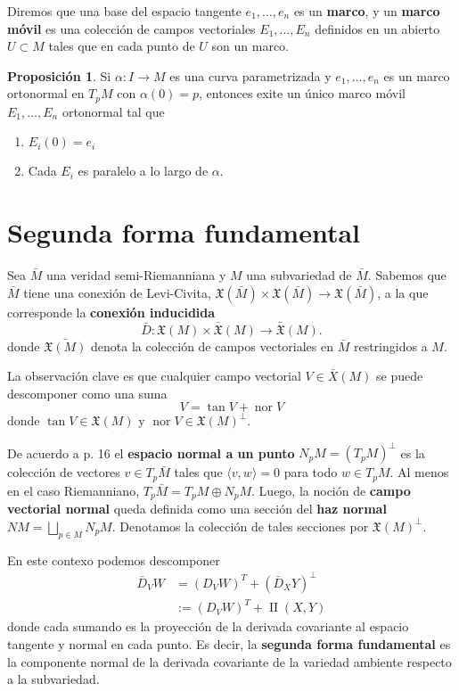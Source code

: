 \documentclass[spanish]{book}
\theoremstyle{definition}
\newtheorem*{prop}{Proposición}
\newcommand{\X}{\mathfrak{X}}
\begin{document}
Diremos que una base del espacio tangente $e_1,\ldots,e_n$ es un \textbf{marco}, y un \textbf{marco móvil} es una colección de campos vectoriales $E_1,\ldots,E_n$ definidos en un abierto $U\subset M$ tales que en cada punto de $U$ son un marco.
\begin{prop}
	Si $\alpha:I\to M$ es una curva parametrizada y $e_1,\ldots,e_n$ es un marco ortonormal en $T_pM$ con $\alpha(0)=p$, entonces exite un único marco móvil $E_1,\ldots,E_n$ ortonormal tal que
	\begin{enumerate}
		\item $E_i(0)=e_i$
		\item Cada $E_i$ es paralelo a lo largo de $\alpha$.
	\end{enumerate}
\end{prop}

\section{Segunda forma fundamental}
Sea $\bar{M}$ una veridad semi-Riemanniana y $M$ una subvariedad de $\bar{M}$. Sabemos que $\bar{M}$ tiene una conexión de Levi-Civita, $\X(\bar{M})\times\X(\bar{M})\to \X(\bar{M})$, a la que corresponde la \textbf{conexión inducidida}
\[\bar{D}:\X(M)\times \bar{\X}(M)\to\bar{\X}(M).\]
donde $\bar{\X(M)}$ denota la colección de campos vectoriales en $\bar{M}$ restringidos a $M$.

La observación clave es que cualquier campo vectorial $V\in\bar{X}(M)$ se puede descomponer como una suma
\[V=\operatorname{tan}V+\operatorname{nor}V\]
donde $\operatorname{tan}V\in\X(M)$ y $\operatorname{nor}V\in\X(M)^\perp$.

De acuerdo a \cite{Lee-riem} p. 16 el \textbf{espacio normal a un punto} $N_pM=(T_pM)^\perp$ es la colección de vectores $v\in T_p\bar{M}$ tales que $\langle v,w\rangle=0$ para todo $w\in T_pM$. Al menos en el caso Riemanniano, $T_p\bar{M}=T_pM\oplus N_pM$. Luego, la noción de \textbf{campo vectorial normal} queda definida como una sección del \textbf{haz normal} $NM=\bigsqcup_{p\in M}N_pM$. Denotamos la colección de tales secciones por $\X(M)^\perp$.

En este contexo podemos descomponer
\begin{align*}
	\bar{D}_VW&=(D_VW)^{T}+(\bar{D}_XY)^\perp\\
	&:=(D_VW)^{T}+\operatorname{II}(X,Y)
\end{align*}
donde cada sumando es la proyección de la derivada covariante al espacio tangente y normal en cada punto. Es decir, la \textbf{segunda forma fundamental} es la componente normal de la derivada covariante de la variedad ambiente respecto a la subvariedad.
\end{document}
